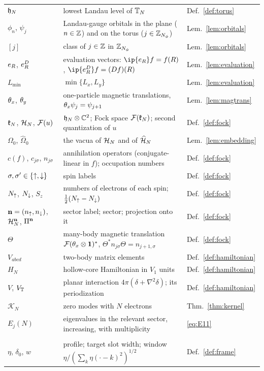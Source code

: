 \begin{longtable}{@{}>{\raggedright\arraybackslash}p{}>{\raggedright\arraybackslash}p{}>{\raggedright\arraybackslash}p{}@{}}
$\mathfrak{h}_N$ & lowest Landau level of $\mathbb{T}_N$ & Def.~\ref{def:torus}\\
$\phi_n$, $\psi_j$ & Landau-gauge orbitals in the plane ($n\in\mathbb{Z}$) and on the torus ($j\in\mathbb{Z}_{N_{\phi}}$) & Lem.~\ref{lem:orbitals}\\
$[j]$ & class of $j\in\mathbb{Z}$ in $\mathbb{Z}_{N_{\phi}}$ & Lem.~\ref{lem:orbitals}\\
$e_{R}$, $e^{D}_{R}$ & evaluation vectors: $\ip{\ev R}f=f(R)$, $\ip{\evD R}f=(Df)(R)$ & Lem.~\ref{lem:evaluation}\\
$L_{\min}$ & $\min\{L_x,L_y\}$ & Lem.~\ref{lem:evaluation}\\
$\theta_x$, $\theta_y$ & one-particle magnetic translations, $\theta_x\psi_j=\psi_{j+1}$ & Lem.~\ref{lem:magtrans}\\
$\mathfrak{k}_N$, $\mathcal{H}_N$, $\mathcal{F}(u)$ & $\mathfrak{h}_N\otimes\mathbb{C}^2$; Fock space $\mathcal{F}(\mathfrak{k}_N)$; second quantization of $u$ & Def.~\ref{def:fock}\\
$\Omega_0$, $\widehat\Omega_0$ & the vacua of $\mathcal{H}_N$ and of $\widehat{\mathcal{H}}_N$ & Lem.~\ref{lem:embedding}\\
$c(f)$, $c_{j\sigma}$, $n_{j\sigma}$ & annihilation operators (conjugate-linear in $f$); occupation numbers & Def.~\ref{def:fock}\\
$\sigma,\sigma'\in\{{\uparrow},{\downarrow}\}$ & spin labels & Def.~\ref{def:fock}\\
$N_{\uparrow}$, $N_{\downarrow}$, $S_z$ & numbers of electrons of each spin; $\frac12(N_{\uparrow}-N_{\downarrow})$ & Def.~\ref{def:fock}\\
$\mathbf{n}=(n_{\uparrow},n_{\downarrow})$, $\mathcal{H}_N^{\mathbf{n}}$, $\Pi^{\mathbf{n}}$ & sector label; sector; projection onto it & Def.~\ref{def:fock}\\
$\Theta$ & many-body magnetic translation $\mathcal{F}(\theta_x\otimes\mathbf{1})^*$, $\Theta^*n_{j\sigma}\Theta=n_{j+1,\sigma}$ & Def.~\ref{def:fock}\\
$V_{abcd}$ & two-body matrix elements & Def.~\ref{def:hamiltonian}\\
$H_N$ & hollow-core Hamiltonian in $V_1$ units & Def.~\ref{def:hamiltonian}\\
$V$, $V_{\mathbb{T}}$ & planar interaction $4\pi(\delta+\nabla^2\delta)$; its periodization & Def.~\ref{def:hamiltonian}\\
$\mathcal K_N$ & zero modes with $N$ electrons & Thm.~\ref{thm:kernel}\\
$E_j(N)$ & eigenvalues in the relevant sector, increasing, with multiplicity & \eqref{eq:E11}\\
\midrule
\multicolumn{3}{@{}l}{\emph{The slot frame (Section~\ref{sec:frame})}}\\*
$\eta$, $\delta_0$, $w$ & profile; target slot width; window $\eta/(\sum_k\eta(\cdot-k)^2)^{1/2}$ & Def.~\ref{def:frame}\\

\end{longtable}
